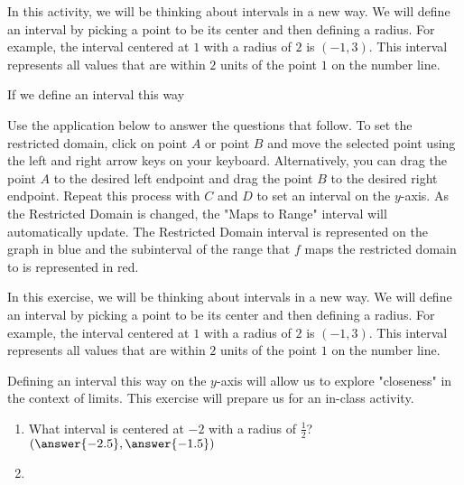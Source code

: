 \documentclass{ximera}
\author{Kevin James}
\begin{document}
   In this activity, we will be thinking about intervals in a new way.  We will define an interval by picking a point to be its center and then defining a radius.  For example, the interval centered at $1$ with a radius of $2$ is $(-1, 3)$.  This interval represents all values that are within $2$ units of the point $1$ on the number line.
   
   If we define an interval this way 
   \begin{exercise}
   	Use the application below to answer the questions that follow.  To set the restricted domain, click on point $ A $ or point $ B $ and move the selected point using the left and right arrow keys on your keyboard.  Alternatively, you can drag the point $ A $ to the desired left endpoint and drag the point $ B $ to the desired right endpoint.  Repeat this process with $ C $ and $ D $ to set an interval on the $y$-axis.  As the Restricted Domain is changed, the "Maps to Range" interval will automatically update.  The Restricted Domain interval is represented on the graph in blue and the subinterval of the range that $ f $ maps the restricted domain to is represented in red.
    
    \begin{center}
    	\begin{onlineOnly}
    	\end{onlineOnly} 
    \end{center}
    
    In this exercise, we will be thinking about intervals in a new way.  We will define an interval by picking a point to be its center and then defining a radius.  For example, the interval centered at $1$ with a radius of $2$ is $(-1, 3)$.  This interval represents all values that are within $2$ units of the point $1$ on the number line.
    
    Defining an interval this way on the $y$-axis will allow us to explore "closeness" in the context of limits.  This exercise will prepare us for an in-class activity.
    
    \begin{enumerate}
    	\item What interval is centered at $-2$ with a radius of $ \frac{1}{2}$? $\left( \answer{-2.5}, \answer{-1.5}\right)$
    	\item 
    \end{enumerate}
    \end{exercise}
\end{document}
